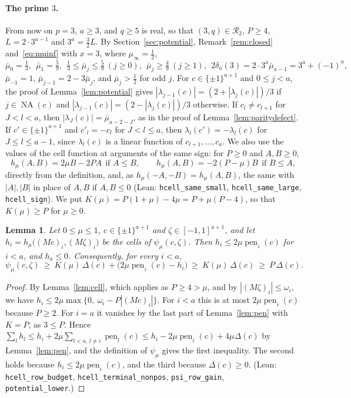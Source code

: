 \documentclass[11pt]{article}
\newtheorem{lemma}[theorem]{Lemma}
\theoremstyle{remark}
\newcommand{\NA}{\operatorname{NA}}
\begin{document}
\paragraph{The prime $3$.} From now on $p=3$, $a\ge3$, and $q\ge5$ is real, so that
$(3,q)\in\mathcal R_2$, $P\ge4$, $L=2\cdot3^{a-1}$ and $3^a=\frac32L$. By
Section~\ref{sec:potential}, Remark~\ref{rem:closed} and~\eqref{eq:muinf} with
$x=3$, where $\mu_\infty=\frac12$,
\begin{equation}\label{eq:threefacts}
\bar\mu_0=\tfrac13,\ \ \bar\mu_1=\tfrac59,\ \ \tfrac13\le\bar\mu_j\le\tfrac59\
(j\ge0),\ \ \bar\mu_j\ge\tfrac49\ (j\ge1),\ \
2\delta_a(3)=2\cdot3^a\bar\mu_{a-1}=3^a+(-1)^a,
\end{equation}
$\bar\mu_{-1}=1$, $\bar\mu_{j-1}=2-3\bar\mu_j$, and $\bar\mu_j>\frac12$ for odd
$j$. For $c\in\{\pm1\}^{a+1}$ and $0\le j<a$, the proof of
Lemma~\ref{lem:potential} gives $|\lambda_{j-1}(c)|=(2+|\lambda_j(c)|)/3$ if
$j\in\NA(c)$ and $|\lambda_{j-1}(c)|=(2-|\lambda_j(c)|)/3$ otherwise. If
$c_l\ne c_{l+1}$ for $J<l<a$, then $|\lambda_J(c)|=\bar\mu_{a-2-J}$, as in the
proof of Lemma~\ref{lem:paritydefect}. If $c'\in\{\pm1\}^{a+1}$ and $c'_l=-c_l$ for
$J<l\le a$, then $\lambda_l(c')=-\lambda_l(c)$ for $J\le l\le a-1$, since
$\lambda_l(c)$ is a linear function of $c_{l+1},\dots,c_a$. We also use the values
of the cell function at arguments of the same sign: for $P\ge0$ and $A,B\ge0$,
\begin{equation}\label{eq:hsame}
h_\mu(A,B)=2\mu B-2PA\ \ \text{if } A\le B,\qquad
h_\mu(A,B)=-2(P-\mu)B\ \ \text{if } B\le A,
\end{equation}
directly from the definition, and, as $h_\mu(-A,-B)=h_\mu(A,B)$, the same with
$|A|,|B|$ in place of $A,B$ if $A,B\le0$ (Lean: \texttt{hcell\_same\_small},
\texttt{hcell\_same\_large}, \texttt{hcell\_sign}). We put
$K(\mu)=P(1+\mu)-4\mu=P+\mu(P-4)$, so that $K(\mu)\ge P$ for $\mu\ge0$.

\begin{lemma}\label{lem:gain}
Let $0\le\mu\le1$, $c\in\{\pm1\}^{a+1}$ and $\zeta\in[-1,1]^{a+1}$, and let
$h_i=h_\mu\bigl((Mc)_i,(M\zeta)_i\bigr)$ be the cells of $\psi_\mu(c,\zeta)$. Then
$h_i\le2\mu\operatorname{pen}_i(c)$ for $i<a$, and $h_a\le0$. Consequently, for
every $i<a$,
\[
\psi_\mu(c,\zeta)\ \ge\ K(\mu)\,\Delta(c)+\bigl(2\mu\operatorname{pen}_i(c)-h_i\bigr)
\ \ge\ K(\mu)\,\Delta(c)\ \ge\ P\,\Delta(c).
\]
\end{lemma}
\begin{proof}
By Lemma~\ref{lem:cell}, which applies as $P\ge4>\mu$, and by
$|(M\zeta)_i|\le\omega_i$, we have $h_i\le2\mu\max\{0,\ \omega_i-P|(Mc)_i|\}$. For
$i<a$ this is at most $2\mu\operatorname{pen}_i(c)$ because $P\ge2$. For $i=a$ it
vanishes by the last part of Lemma~\ref{lem:pen} with $K=P$, as $3\le P$. Hence
$\sum_lh_l\le h_i+2\mu\sum_{l<a,\,l\ne i}\operatorname{pen}_l(c)
\le h_i-2\mu\operatorname{pen}_i(c)+4\mu\Delta(c)$ by Lemma~\ref{lem:pen}, and the
definition of $\psi_\mu$ gives the first inequality. The second holds because
$h_i\le2\mu\operatorname{pen}_i(c)$, and the third because $\Delta(c)\ge0$.
(Lean: \texttt{hcell\_row\_budget}, \texttt{hcell\_terminal\_nonpos},
\texttt{psi\_row\_gain}, \texttt{potential\_lower}.)
\end{proof}
\end{document}
